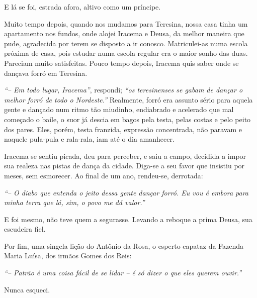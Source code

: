 E lá se foi, estrada afora, altivo como um príncipe.

Muito tempo depois, quando nos mudamos para Teresina, nossa casa tinha um apartamento nos fundos, onde alojei Iracema e Deusa, da melhor maneira que pude, agradecida por terem se disposto a ir conosco.
Matriculei-as numa escola próxima de casa, pois estudar numa escola regular era o maior sonho das duas.
Pareciam muito satisfeitas.
Pouco tempo depois, Iracema quis saber onde se dançava forró em Teresina.

\textit{``-- Em todo lugar, Iracema''}, respondi; \textit{``os teresinenses se gabam de dançar o melhor forró de todo o Nordeste.''}
Realmente, forró era assunto sério para aquela gente e dançado num ritmo tão miudinho, endiabrado e acelerado que mal começado o baile, o suor já descia em bagos pela testa, pelas costas e pelo peito dos pares.
Eles, porém, testa franzida, expressão concentrada, não paravam e naquele pula-pula e rala-rala, iam até o dia amanhecer.

Iracema se sentiu picada, deu para perceber, e saiu a campo, decidida a impor sua realeza nas pistas de dança da cidade.
Diga-se a seu favor que insistiu por meses, sem esmorecer.
Ao final de um ano, rendeu-se, derrotada:

\textit{``-- O diabo que entenda o jeito dessa gente dançar forró.
Eu vou é embora para minha terra que lá, sim, o povo me dá valor.''}

E foi mesmo, não teve quem a segurasse.
Levando a reboque a prima Deusa, sua escudeira fiel.

Por fim, uma singela lição do Antônio da Rosa, o esperto capataz da Fazenda Maria Luísa, dos irmãos Gomes dos Reis:

\textit{``-- Patrão é uma coisa fácil de se lidar -- é só dizer o que eles querem ouvir.''} 

Nunca esqueci.

